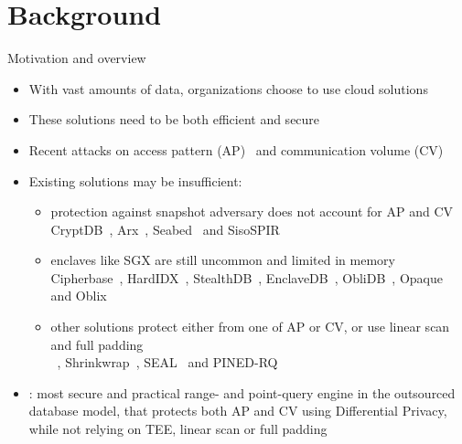 
\newlength{\listLabelLength}

\section{Background}

	\begin{frame}{Motivation and overview}

		\begin{itemize}
			\item<1-> With vast amounts of data, organizations choose to use cloud solutions
			\item<1-> These solutions need to be both efficient and secure
			\item<2-> Recent attacks on access pattern (AP)~\cite{multidimensional-range-queries, inference-attack-islam-14, leakage-abuse-attacks-cash-15, inference-attacks-naveed-15, generic-attacks-kellaris, attacks-tao-of-inference, grubbs-attacks, access-pattern-disclosure, atacks-improved-reconstruction} and communication volume (CV)~\cite{generic-attacks-kellaris, state-of-uniform, atacks-improved-reconstruction, pump-volume-attacks, volume-range-attacks}
			\item<3->
				Existing solutions may be insufficient:
				\begin{itemize}
					\item<1,2,3,6-> \normalsize
						protection against snapshot adversary does not account for AP and CV \\
						\small{CryptDB~\cite{crypt-db}, Arx~\cite{arx}, Seabed~\cite{seabed} and SisoSPIR~\cite{sisospir}}

					\item<1,2,4,6-> \normalsize
						enclaves like SGX are still uncommon and limited in memory \\
						\small{Cipherbase~\cite{cipherbase}, HardIDX~\cite{hardidx}, StealthDB~\cite{stealth-db}, EnclaveDB~\cite{enclave-db}, ObliDB~\cite{oblidb}, Opaque~\cite{opaque} and Oblix~\cite{oblix}}

					\item<1,2,5,6-> \normalsize
						other solutions protect either from one of AP or CV, or use linear scan and full padding \\
						\small{\crypte~\cite{crypte}, Shrinkwrap~\cite{shrinkwrap}, SEAL~\cite{seal} and PINED-RQ~\cite{pined-rq}}
				\end{itemize}
			\item<6-> \epsolute{}: most secure and practical range- and point-query engine in the outsourced database model, that protects both AP and CV using Differential Privacy, while not relying on TEE, linear scan or full padding
		\end{itemize}

	\end{frame}

